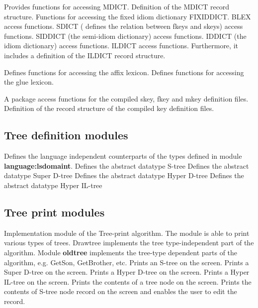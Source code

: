 \bsc
{} Provides functions for accessing MDICT.
   \bsc
    Definition of the MDICT record structure.
   \esc
{} Functions for accessing the fixed idiom
                           dictionary FIXIDDICT.
 BLEX access functions.
 SDICT ( defines the relation between fkeys and
                       skeys) access functions.
 SIDDICT (the semi-idiom dictionary) access
                         functions.
 IDDICT (the idiom dictionary) access
                         functions.
 ILDICT access functions. Furthermore, it
                        includes a definition of the ILDICT record structure.

 Defines functions for accessing the affix lexicon.
 Defines functions for accessing the glue lexicon.

 A package access functions for the compiled skey, fkey
                        and mkey definition files.
   \bsc
    Definition of the record structure of the
                              compiled key definition files.
   \esc
\esc

\subsection{Tree definition modules}

\bsc
{} Defines the language independent counterparts of
                        the types defined in module {\bf language:lsdomaint}.
\esc
\bsc
{} Defines the abstract datatype S-tree
 Defines the abstract datatype Super D-tree
 Defines the abstract datatype Hyper D-tree
 Defines the abstract datatype Hyper IL-tree
\esc

\subsection{Tree print modules}

\bsc
{} Implementation module of the Tree-print algorithm. The module
                is able to print various types of trees. Drawtree implements
                the tree type-independent part of the algorithm.
 Module {\bf oldtree} implements the tree-type dependent parts
               of the algorithm, e.g. GetSon, GetBrother, etc.
\esc
\bsc
{} Prints an S-tree on the screen.
 Prints a Super D-tree on the screen.
 Prints a Hyper D-tree on the screen.
 Prints a Hyper IL-tree on the screen.
\esc
\bsc
{} Prints the contents of a tree node on the screen.
 Prints the contents of S-tree node record on the screen and
                   enables the user to edit the record.
\esc

